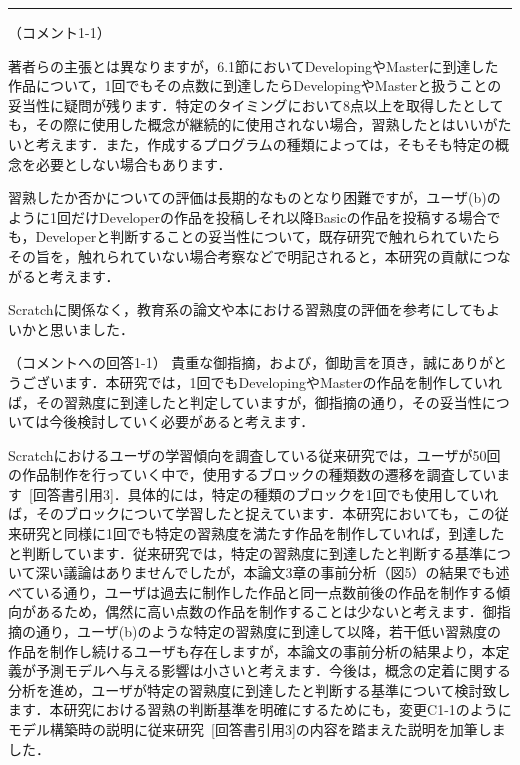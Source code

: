 \documentclass{jarticle} %
\newcommand{\todo}[1]{\colorbox{yellow}{{\bf TODO}:}{\color{red}{\textbf{[#1]}}}}
\def\subsection#1{ \vspace{1pc} {\gt #1} }
\def\nextans{ \vspace{2pc} \hrule }
\begin{document}
\newpage
\nextans
\subsection{（コメント1-1）}

著者らの主張とは異なりますが，6.1節においてDevelopingやMasterに到達した作品について，1回でもその点数に到達したらDevelopingやMasterと扱うことの妥当性に疑問が残ります．特定のタイミングにおいて8点以上を取得したとしても，その際に使用した概念が継続的に使用されない場合，習熟したとはいいがたいと考えます．また，作成するプログラムの種類によっては，そもそも特定の概念を必要としない場合もあります．

習熟したか否かについての評価は長期的なものとなり困難ですが，ユーザ(b)のように1回だけDeveloperの作品を投稿しそれ以降Basicの作品を投稿する場合でも，Developerと判断することの妥当性について，既存研究で触れられていたらその旨を，触れられていない場合考察などで明記されると，本研究の貢献につながると考えます．

Scratchに関係なく，教育系の論文や本における習熟度の評価を参考にしてもよいかと思いました．

\subsection{（コメントへの回答1-1）}
貴重な御指摘，および，御助言を頂き，誠にありがとうございます．本研究では，1回でもDevelopingやMasterの作品を制作していれば，その習熟度に到達したと判定していますが，御指摘の通り，その妥当性については今後検討していく必要があると考えます．

Scratchにおけるユーザの学習傾向を調査している従来研究では，ユーザが50回の作品制作を行っていく中で，使用するブロックの種類数の遷移を調査しています~[回答書引用3]．具体的には，特定の種類のブロックを1回でも使用していれば，そのブロックについて学習したと捉えています．本研究においても，この従来研究と同様に1回でも特定の習熟度を満たす作品を制作していれば，到達したと判断しています．従来研究では，特定の習熟度に到達したと判断する基準について深い議論はありませんでしたが，本論文3章の事前分析（図5）の結果でも述べている通り，ユーザは過去に制作した作品と同一点数前後の作品を制作する傾向があるため，偶然に高い点数の作品を制作することは少ないと考えます．御指摘の通り，ユーザ(b)のような特定の習熟度に到達して以降，若干低い習熟度の作品を制作し続けるユーザも存在しますが，本論文の事前分析の結果より，本定義が予測モデルへ与える影響は小さいと考えます．今後は，概念の定着に関する分析を進め，ユーザが特定の習熟度に到達したと判断する基準について検討致します．本研究における習熟の判断基準を明確にするためにも，変更C1-1のようにモデル構築時の説明に従来研究~[回答書引用3]の内容を踏まえた説明を加筆しました．\\
\end{document}
